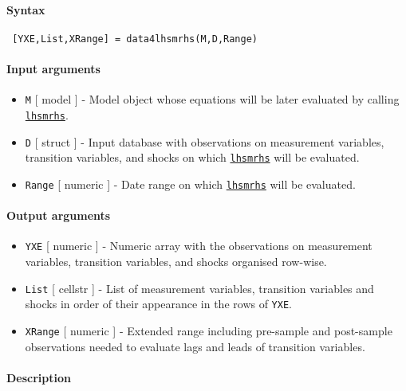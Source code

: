 


	\paragraph{Syntax}
 
 \begin{verbatim}
 [YXE,List,XRange] = data4lhsmrhs(M,D,Range)
 \end{verbatim}
 
 \paragraph{Input arguments}
 
 \begin{itemize}
 \item
   \texttt{M} {[} model {]} - Model object whose equations will be later
   evaluated by calling \href{model/lhsmrhs}{\texttt{lhsmrhs}}.
 \item
   \texttt{D} {[} struct {]} - Input database with observations on
   measurement variables, transition variables, and shocks on which
   \href{model/lhsmrhs}{\texttt{lhsmrhs}} will be evaluated.
 \item
   \texttt{Range} {[} numeric {]} - Date range on which
   \href{model/lhsmrhs}{\texttt{lhsmrhs}} will be evaluated.
 \end{itemize}
 
 \paragraph{Output arguments}
 
 \begin{itemize}
 \item
   \texttt{YXE} {[} numeric {]} - Numeric array with the observations on
   measurement variables, transition variables, and shocks organised
   row-wise.
 \item
   \texttt{List} {[} cellstr {]} - List of measurement variables,
   transition variables and shocks in order of their appearance in the
   rows of \texttt{YXE}.
 \item
   \texttt{XRange} {[} numeric {]} - Extended range including pre-sample
   and post-sample observations needed to evaluate lags and leads of
   transition variables.
 \end{itemize}
 
 \paragraph{Description}
 
